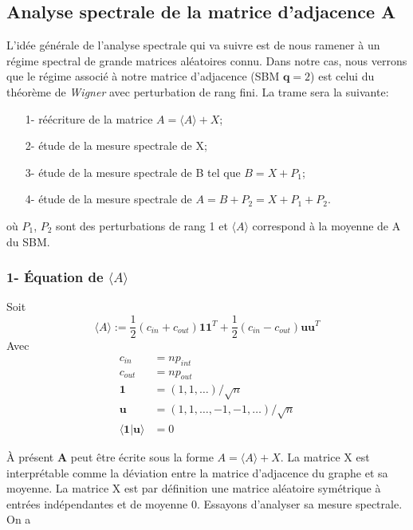 \subsection{Analyse spectrale de la matrice d'adjacence \textbf{A}}\label{ch:Analyse spectrale de la matrice d'adjacence}
L'idée générale de l'analyse spectrale qui va suivre est de nous ramener à un régime spectral de grande matrices aléatoires connu. 
Dans notre cas, nous verrons que le régime associé à notre matrice d'adjacence (SBM $\textbf{q}=2$) est celui du théorème de \textit{Wigner} avec perturbation de rang fini.
La trame sera la suivante:
\begin{itemize}
 	\item[1-] réécriture de la matrice $A = \langle A \rangle + X$;
 	\item[2-] étude de la mesure spectrale de X;
 	\item[3-] étude de la mesure spectrale de B tel que $B = X + P_1$;
 	\item[4-] étude de la mesure spectrale de $A = B + P_2 = X + P_1 + P_2$.
 \end{itemize} 
où $P_1$, $P_2$ sont des perturbations de rang 1 et $\langle A \rangle$ correspond à la moyenne de A du SBM.\\

\subsubsection*{1- Équation de $\langle A \rangle$}
Soit
\begin{equation} 
\langle A \rangle := \frac{1}{2}(c_{in} + c_{out})\mathbf{11}^T + \frac{1}{2}(c_{in} - c_{out})\mathbf{uu}^T \label{eq:1}
\end{equation}
Avec
\begin{align*}
c_{in} &= np_{int} \\
c_{out} &= np_{out}\\
\mathbf{1} &= (1, 1, \ldots)/\sqrt{n}\\
\mathbf{u} &= (1, 1, \ldots, -1, -1, \ldots)/\sqrt{n}\\
\langle\mathbf{1}|\mathbf{u}\rangle &= 0
\end{align*}


À présent \textbf{A} peut être écrite sous la forme $A = \langle A \rangle + X$.
La matrice X est interprétable comme la déviation entre la matrice d'adjacence du graphe et sa moyenne.
La matrice X est par définition une matrice aléatoire symétrique à entrées indépendantes et de moyenne 0.
Essayons d'analyser sa mesure spectrale.
On a 

